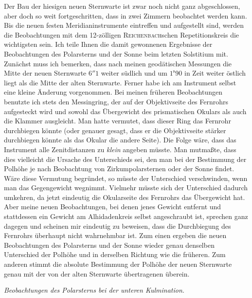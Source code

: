 \par\indent Der Bau der hiesigen neuen Sternwarte ist zwar noch nicht ganz abgeschlossen, aber doch so weit fortgeschritten, dass in zwei Zimmern beobachtet werden kann. Bis die neuen festen Meridianinstrumente eintreffen und aufgestellt sind, werden die Beobachtungen mit dem 12-zölligen \textsc{Reichenbach}schen Repetitionskreis die wichtigsten sein. Ich teile Ihnen die damit gewonnenen Ergebnisse der Beobachtungen des Polarsterns und der Sonne beim letzten Solstitium mit. Zunächst muss ich bemerken, dass nach meinen geodätischen Messungen die Mitte der neuen Sternwarte $6''1$ weiter südlich und um $1^{\mathrm s}90$ in Zeit weiter östlich liegt als die Mitte der alten Sternwarte. Ferner habe ich am Instrument selbst eine kleine Änderung vorgenommen. Bei meinen früheren Beobachtungen benutzte ich stets den Messingring, der auf der Objektivseite des Fernrohrs aufgesteckt wird und sowohl das Übergewicht des prismatischen Okulars als auch die Klammer ausgleicht. Man hatte vermutet, dass dieser Ring das Fernrohr durchbiegen könnte (oder genauer gesagt, dass er die Objektivseite stärker durchbiegen könnte als das Okular die andere Seite). Die Folge wäre, dass das Instrument alle Zenitdistanzen zu \emph{klein} angeben müsste. Man mutmaßte, dass dies vielleicht die Ursache des Unterschieds sei, den man bei der Bestimmung der Polhöhe je nach Beobachtung von Zirkumpolarsternen oder der Sonne findet. Wäre diese Vermutung begründet, so müsste der Unterschied verschwinden, wenn man das Gegengewicht wegnimmt. Vielmehr müsste sich der Unterschied dadurch umkehren, da jetzt eindeutig die Okularseite des Fernrohrs das Übergewicht hat. Aber meine neuen Beobachtungen, bei denen jenes Gewicht entfernt und stattdessen ein Gewicht am Alhidadenkreis selbst angeschraubt ist, sprechen ganz dagegen und scheinen mir eindeutig zu beweisen, dass die Durchbiegung des Fernrohrs überhaupt nicht wahrnehmbar ist. Zum einen ergeben die neuen Beobachtungen des Polarsterns und der Sonne wieder genau denselben Unterschied der Polhöhe und in derselben Richtung wie die früheren. Zum anderen stimmt die absolute Bestimmung der Polhöhe der neuen Sternwarte genau mit der von der alten Sternwarte übertragenen überein.

\par\indent\emph{Beobachtungen des Polarsterns bei der unteren Kulmination.}

